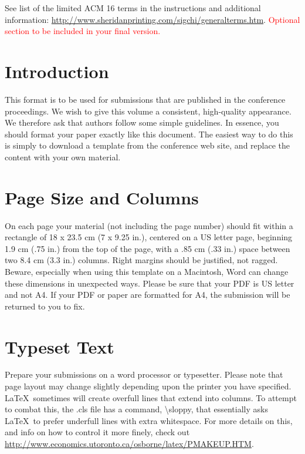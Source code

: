 \documentclass{article}
\begin{document}

See list of the limited ACM 16 terms in the
instructions and additional information:
\url{http://www.sheridanprinting.com/sigchi/generalterms.htm}.
\textcolor{red}{Optional section to be included in your final version.}

\section{Introduction}

This format is to be used for submissions that are
published in the conference proceedings.  We wish to give
this volume a consistent, high-quality appearance. We
therefore ask that authors follow some simple
guidelines. In essence, you should format your paper
exactly like this document. The easiest way to do this is
simply to download a template from the conference web
site, and replace the content with your own material.

\section{Page Size and Columns}

On each page your material (not including the page number) should fit
within a rectangle of 18 x 23.5 cm (7 x 9.25 in.), centered on a US
letter page, beginning 1.9 cm (.75 in.) from the top of the page, with
a .85 cm (.33 in.) space between two 8.4 cm (3.3 in.) columns.  Right
margins should be justified, not ragged. Beware, especially when using
this template on a Macintosh, Word can change these dimensions in
unexpected ways. Please be sure that your PDF is US letter and not
A4. If your PDF or paper are formatted for A4, the submission will be
returned to you to fix.

\section{Typeset Text}

Prepare your submissions on a word processor or typesetter.  Please
note that page layout may change slightly depending upon the printer
you have specified.  \LaTeX\ sometimes will create overfull lines
that extend into columns.  To attempt to combat this, the .cls
file has a command, {\textbackslash}sloppy, that essentially asks
\LaTeX\ to prefer underfull lines with extra whitespace.  For more
details on this, and info on how to control it more finely, check out
{\url{http://www.economics.utoronto.ca/osborne/latex/PMAKEUP.HTM}}.
\end{document}
